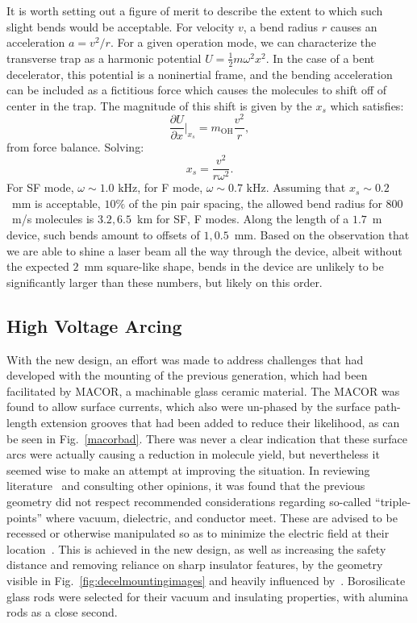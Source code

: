 It is worth setting out a figure of merit to describe the extent to which such slight bends would be acceptable. 
For velocity $v$, a bend radius $r$ causes an acceleration $a=v^2/r$. 
For a given operation mode, we can characterize the transverse trap as a harmonic potential $U=\frac{1}{2}m\omega^2x^2$. 
In the case of a bent decelerator, this potential is a noninertial frame, and the bending acceleration can be included as a fictitious force which causes the molecules to shift off of center in the trap.
The magnitude of this shift is given by the $x_s$ which satisfies:
\begin{equation}
\frac{\partial U}{\partial x}\biggr|_{x_s} = m_\text{OH}\frac{v^2}{r},
\end{equation}
from force balance. Solving:
\begin{equation}
x_s = \frac{v^2}{r\omega^2}.
\end{equation}
For SF mode, $\omega\sim1.0\text{ kHz}$, for F mode, $\omega\sim0.7\text{ kHz}$. Assuming that $x_s\sim0.2$~mm is acceptable, $10\%$ of the pin pair spacing, the allowed bend radius for $800$~m/s molecules is $3.2, 6.5$~km for SF, F modes.
Along the length of a $1.7$~m device, such bends amount to offsets of $1, 0.5$~mm.
Based on the observation that we are able to shine a laser beam all the way through the device, albeit without the expected $2$~mm square-like shape, bends in the device are unlikely to be significantly larger than these numbers, but likely on this order.

\subsection{High Voltage Arcing}

With the new design, an effort was made to address challenges that had developed with the mounting of the previous generation, which had been facilitated by MACOR, a machinable glass ceramic material.
The MACOR was found to allow surface currents, which also were un-phased by the surface path-length extension grooves that had been added to reduce their likelihood, as can be seen in Fig.~\ref{macorbad}.
There was never a clear indication that these surface arcs were actually causing a reduction in molecule yield, but nevertheless it seemed wise to make an attempt at improving the situation.
In reviewing literature~\cite[Sec.~4.3.3]{Faircloth2013} and consulting other opinions, it was found that the previous geometry did not respect recommended considerations regarding so-called ``triple-points'' where vacuum, dielectric, and conductor meet. 
These are advised to be recessed or otherwise manipulated so as to minimize the electric field at their location~\cite{Miller1989}.
This is achieved in the new design, as well as increasing the safety distance and removing reliance on sharp insulator features, by the geometry visible in Fig.~\ref{fig:decelmountingimages} and heavily influenced by~\citep[Fig.~4]{VanDeMeerakker2006}.
Borosilicate glass rods were selected for their vacuum and insulating properties, with alumina rods as a close second.


